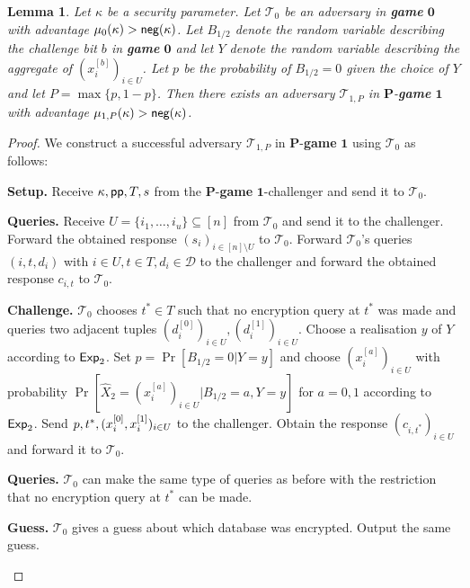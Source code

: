 \documentclass[10pt]{extarticle}
\newtheorem{Lem}[Thm]{Lemma}
\begin{document}
\begin{Lem}\label{gamezeroPone} Let $\kappa$ be a security parameter. Let $\mathcal{T}_0$ be an adversary in \textbf{\upshape game} $\boldsymbol 0$ with advantage $\mu_{0}(\kappa)>\text{\upshape\sffamily neg}(\kappa)$. Let $B_{1/2}$ denote the random variable describing the challenge bit $b$ in \textbf{\upshape game} $\boldsymbol 0$ and let $Y$ denote the random variable describing the aggregate of $(x_i^{[b]})_{i\in U}$. Let $p$ be the probability of $B_{1/2}=0$ given the choice of $Y$ and let $P=\max\{p,1-p\}$. Then there exists an adversary $\mathcal{T}_{1,P}$ in $\boldsymbol P$-\textbf{\upshape game} $\boldsymbol 1$ with advantage $\mu_{1,P}(\kappa)>\text{\upshape\sffamily neg}(\kappa)$.
\end{Lem}
\begin{proof} We construct a successful adversary $\mathcal{T}_{1,P}$ in $\boldsymbol P$-\textbf{game} $\boldsymbol 1$ using $\mathcal{T}_0$ as follows:
\noindent\begin{description}
 \item\textbf{Setup.} Receive $\kappa, \mbox{\upshape\sffamily pp},T,s$ from the $\boldsymbol P$-\textbf{game} $\boldsymbol 1$-challenger and send it to $\mathcal{T}_0$.
\item\textbf{Queries.} Receive $U=\{i_1,\ldots,i_u\}\subseteq[n]$ from $\mathcal{T}_0$ and send it to the challenger. Forward the obtained response $(s_i)_{i\in[n]\setminus U}$ to $\mathcal{T}_0$. Forward $\mathcal{T}_0$'s queries $(i,t,d_i)$ with $i\in U, t\in T, d_i\in\mathcal{D}$ to the challenger and forward the obtained response $c_{i,t}$ to $\mathcal{T}_0$.
\item\textbf{Challenge.} $\mathcal{T}_0$ chooses $t^*\in T$ such that no encryption query at $t^*$ was made and queries two adjacent tuples $(d_i^{[0]})_{i\in U},(d_i^{[1]})_{i\in U}$. Choose a realisation $y$ of $Y$ according to $\mbox{\upshape \sffamily Exp}_2$. Set $p=\Pr[B_{1/2}=0| Y=y]$ and choose $(x_i^{[a]})_{i\in U}$ with probability $\Pr[\widehat{X}_2=(x_i^{[a]})_{i\in U}| B_{1/2}=a, Y=y]$ for $a=0,1$ according to $\mbox{\upshape \sffamily Exp}_2$. Send $p,t^*,\linebreak(x_i^{[0]},x_i^{[1]})_{i\in U}$ to the challenger. Obtain the response $(c_{i,t^*})_{i\in U}$ and forward it to $\mathcal{T}_0$. 
\item\textbf{Queries.} $\mathcal{T}_0$ can make the same type of queries as before with the restriction that no encryption query at $t^*$ can be made.
\item\textbf{Guess.} $\mathcal{T}_0$ gives a guess about which database was encrypted. Output the same guess.

\end{description}
\end{proof}
\end{document}
